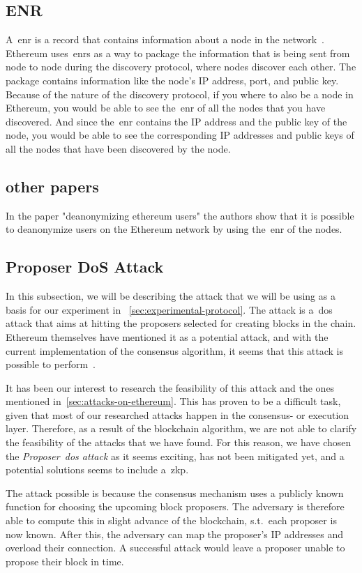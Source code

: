 \subsection{ENR}\label{subsec:enr}
A~\gls{enr} is a record that contains information about a node in the network~\cite{EIP-778:Ethereum-Node-Records}.
Ethereum uses~\glspl{enr} as a way
to package the information that is being sent from node to node during the discovery protocol,
where nodes discover each other.
The package contains information like the node's IP address, port, and public key.
Because of the nature of the discovery protocol, if you where to also be a node in Ethereum,
you would be able to see the~\gls{enr} of all the nodes that you have discovered.
And since the~\gls{enr} contains the IP address and the public key of the node,
you would be able
to see the corresponding IP addresses and public keys of all the nodes that have been discovered by the node.


\subsection{other papers}\label{subsec:other-papers} 
In the paper "deanonymizing ethereum users" the authors show that it is possible to deanonymize users on the Ethereum network by using the~\gls{enr} of the nodes.


\subsection{Proposer DoS Attack}\label{subsec:proposer-dos-attack}
In this subsection, we will be describing the attack that we will be using as a basis for our experiment in ~\autoref{sec:experimental-protocol}.
The attack is a~\gls{dos} attack that aims at hitting the proposers selected for creating blocks in the chain.
Ethereum themselves have mentioned it as a potential attack, and with the current implementation of the consensus algorithm, it seems that this attack is possible to perform~\cite{EthereumSSLE2024,EthereumAttackDefense2024}.

It has been our interest to research the feasibility of this attack and the ones mentioned in~\autoref{sec:attacks-on-ethereum}.
This has proven to be a difficult task, given that most of our researched attacks happen in the consensus- or execution layer.
Therefore, as a result of the blockchain algorithm, we are not able to clarify the feasibility of the attacks that we have found.
For this reason, we have chosen the \textit{Proposer~\gls{dos} attack} as it seems exciting, has not been mitigated yet, and a potential solutions seems to include a~\gls{zkp}.

The attack possible is because the consensus mechanism uses a publicly known function for choosing the upcoming block proposers.
The adversary is therefore able to compute this in slight advance of the blockchain, s.t.\ each proposer is now known.
After this, the adversary can map the proposer's IP addresses and overload their connection.
A successful attack would leave a proposer unable to propose their block in time.